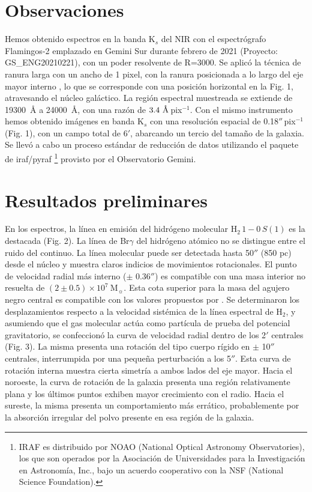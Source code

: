 \documentclass[baaa]{baaa}
\begin{document}
\section{Observaciones}
Hemos obtenido espectros en la banda K$_{s}$ del NIR con el espectrógrafo Flamingos-2 emplazado en Gemini Sur durante febrero de 2021 (Proyecto: GS\_ENG20210221), con un poder resolvente de R=3000. Se aplicó la técnica de ranura larga con un ancho de 1 pixel, con la ranura posicionada a lo largo del eje mayor interno  \citep[PA=155°,][]{Espada}, lo que se corresponde con una posición horizontal en la Fig. 1, atravesando el núcleo galáctico. La región espectral muestreada se extiende de 19300\textup{~\AA} a 24000\textup{~\AA}, con una razón de $3.4 \textup{~\AA}$\,pix$^{-1}$.
Con el mismo instrumento hemos obtenido imágenes en banda K$_{s}$ con una resolución espacial de 0.18$''$\,pix$^{-1}$ (Fig. 1), con un campo total de 6$'$, abarcando un tercio del tamaño de
la galaxia.
Se llevó a cabo un proceso estándar de reducción de datos utilizando el paquete de {\sc iraf/pyraf} \footnote{IRAF es distribuido por NOAO (National Optical Astronomy Observatories), los que son operados por la Asociación de Universidades para la Investigación en Astronomía, Inc., bajo un acuerdo cooperativo con la NSF (National Science Foundation).} provisto por el Observatorio Gemini.


\section{Resultados preliminares}

En los espectros, la línea en emisión del hidrógeno molecular H$_{2} \,1-0\, S(1)$ \citep[2,12$\mu$m,][]{2019yCat..36300058R} es la destacada (Fig. 2). La línea de Br$\gamma$ del hidrógeno atómico no se distingue entre el ruido del continuo. La línea molecular puede ser detectada hasta 50$''$ (850 pc) desde el núcleo y muestra claros indicios de movimientos rotacionales. El punto de velocidad radial más interno ($\pm$ 0.36$''$) es compatible con una masa interior no resuelta de $(2\pm 0.5)\times 10^7~\mathrm{M}_{\sun}$. Esta cota superior para la masa del agujero negro central es compatible con los valores propuestos por \citet{Neumayer}.  Se determinaron los desplazamientos respecto a la velocidad sistémica de la línea espectral de H$_{2}$, y asumiendo que el gas molecular actúa como partícula de prueba del potencial gravitatorio, se confeccionó la curva de velocidad radial dentro de los 2$'$ centrales (Fig. 3). La misma presenta una rotación del tipo cuerpo rígido en $\pm$ 10$''$ centrales, interrumpida por una pequeña perturbación a los 5$''$. Esta curva de rotación interna muestra cierta simetría a ambos lados del eje mayor. Hacia el noroeste, la curva de rotación de la galaxia presenta una región relativamente plana y los últimos puntos exhiben mayor crecimiento con el radio. Hacia el sureste, la misma presenta un comportamiento más errático, probablemente por la absorción irregular del polvo presente en esa región de la galaxia.
\end{document}
